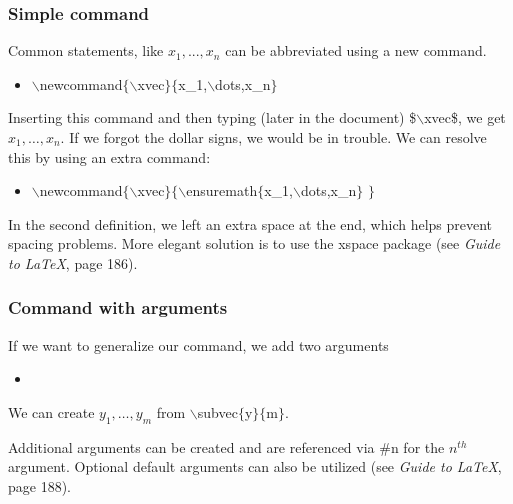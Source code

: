 \begin{frame}  \frametitle{Simple command}
\newcommand{\xvec}{x_1, \ldots, x_n}
Common statements, like $x_1, ..., x_n$ can be abbreviated using a new command.
\begin{itemize}
\item[] {\color{command}$\backslash$newcommand\color{braces}$\{${\color{command}$\backslash$xvec}$\}\{${\color{black}x\_1,{\color{command}$\backslash$dots},x\_n}$\}$}
\end{itemize}
Inserting this command and then typing (later in the document) {\color{braces}\$\color{command}$\backslash$xvec\color{braces}\$}, we get $\xvec$. If we forgot the dollar signs, we would be in trouble. We can resolve this by using an extra command:
\begin{itemize}
\item[] {\color{command}$\backslash$newcommand\color{braces}$\{${\color{command}$\backslash$xvec}$\}\{${\color{command}$\backslash$ensuremath{\color{braces}$\{$}{\color{black}x\_1,{\color{command}$\backslash$dots},x\_n}}$\}$ $\}$}
\end{itemize}
In the second definition, we left an extra space at the end, which helps prevent spacing problems. More elegant solution is to use the {\color{highlight}xspace} package (see \textit{Guide to LaTeX}, page 186).
\end{frame}

\newcommand{\subvec}[2]{\ensuremath{#1_{1}, \ldots, #1_{#2}} }
\begin{frame}  \frametitle{Command with arguments}
If we want to generalize our command, we add two arguments
\begin{itemize}
\item[] 
\end{itemize}
We can create \subvec{y}{m} from {\color{command}$\backslash$subvec\color{braces}$\{${\color{black}y}$\}\{${\color{black}m}$\}$}.

\vspace{7mm}

Additional arguments can be created and are referenced via \#n for the $n^{th}$ argument. Optional default arguments can also be utilized (see \textit{Guide to LaTeX}, page 188).
\end{frame}

